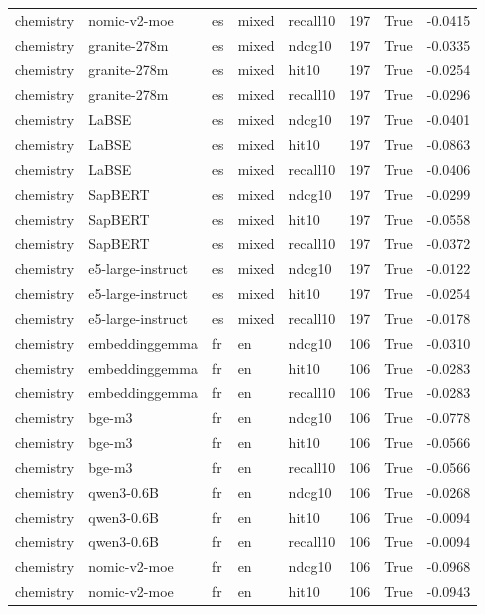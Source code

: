 \begin{tabular}{lllllrrr}
chemistry & nomic-v2-moe & es & mixed & recall10 & 197 & True & -0.0415 \\
chemistry & granite-278m & es & mixed & ndcg10 & 197 & True & -0.0335 \\
chemistry & granite-278m & es & mixed & hit10 & 197 & True & -0.0254 \\
chemistry & granite-278m & es & mixed & recall10 & 197 & True & -0.0296 \\
chemistry & LaBSE & es & mixed & ndcg10 & 197 & True & -0.0401 \\
chemistry & LaBSE & es & mixed & hit10 & 197 & True & -0.0863 \\
chemistry & LaBSE & es & mixed & recall10 & 197 & True & -0.0406 \\
chemistry & SapBERT & es & mixed & ndcg10 & 197 & True & -0.0299 \\
chemistry & SapBERT & es & mixed & hit10 & 197 & True & -0.0558 \\
chemistry & SapBERT & es & mixed & recall10 & 197 & True & -0.0372 \\
chemistry & e5-large-instruct & es & mixed & ndcg10 & 197 & True & -0.0122 \\
chemistry & e5-large-instruct & es & mixed & hit10 & 197 & True & -0.0254 \\
chemistry & e5-large-instruct & es & mixed & recall10 & 197 & True & -0.0178 \\
chemistry & embeddinggemma & fr & en & ndcg10 & 106 & True & -0.0310 \\
chemistry & embeddinggemma & fr & en & hit10 & 106 & True & -0.0283 \\
chemistry & embeddinggemma & fr & en & recall10 & 106 & True & -0.0283 \\
chemistry & bge-m3 & fr & en & ndcg10 & 106 & True & -0.0778 \\
chemistry & bge-m3 & fr & en & hit10 & 106 & True & -0.0566 \\
chemistry & bge-m3 & fr & en & recall10 & 106 & True & -0.0566 \\
chemistry & qwen3-0.6B & fr & en & ndcg10 & 106 & True & -0.0268 \\
chemistry & qwen3-0.6B & fr & en & hit10 & 106 & True & -0.0094 \\
chemistry & qwen3-0.6B & fr & en & recall10 & 106 & True & -0.0094 \\
chemistry & nomic-v2-moe & fr & en & ndcg10 & 106 & True & -0.0968 \\
chemistry & nomic-v2-moe & fr & en & hit10 & 106 & True & -0.0943 \\

\end{tabular}
